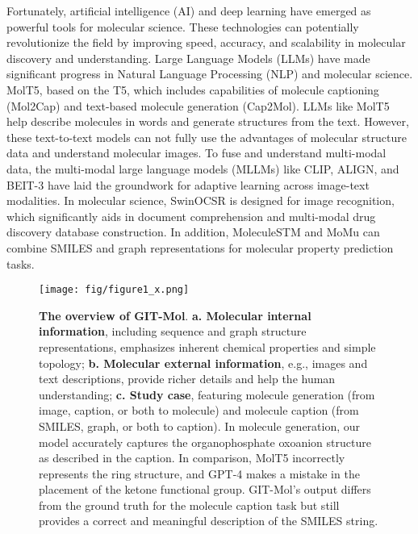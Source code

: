 \documentclass{article}
\begin{document}
Fortunately, artificial intelligence (AI) and deep learning have emerged as powerful tools for molecular science. These technologies can potentially revolutionize the field by improving speed, accuracy, and scalability in molecular discovery and understanding. Large Language Models (LLMs) have made significant progress in Natural Language Processing (NLP) and molecular science. MolT5\cite{edwards2022translation}, based on the T5\cite{raffel2020exploring}, which includes capabilities of molecule captioning (Mol2Cap) and text-based molecule generation (Cap2Mol). LLMs like MolT5 help describe molecules in words and generate structures from the text. However, these text-to-text models can not fully use the advantages of molecular structure data and understand molecular images.
To fuse and understand multi-modal data, the multi-modal large language models (MLLMs) like CLIP\cite{radford2021learning}, ALIGN\cite{jia2021scaling}, and BEIT-3\cite{wang2022image} have laid the groundwork for adaptive learning across image-text modalities. In molecular science, SwinOCSR\cite{xu2022swinocsr} is designed for image recognition, which significantly aids in document comprehension and multi-modal drug discovery database construction\cite{wang2022multi}. In addition, MoleculeSTM\cite{liu2022multi} and MoMu\cite{su2022molecular} can combine SMILES and graph representations for molecular property prediction tasks.

\begin{figure*}[t!]
\centering
\texttt{[image: fig/figure1\_x.png]}
\caption{\textbf{The overview of GIT-Mol}. \textbf{a. Molecular internal information}, including sequence and graph structure representations, emphasizes inherent chemical properties and simple topology; \textbf{b. Molecular external information}, e.g., images and text descriptions, provide richer details and help the human understanding; \textbf{c. Study case}, featuring molecule generation (from image, caption, or both to molecule) and molecule caption (from SMILES, graph, or both to caption). In molecule generation, our model accurately captures the organophosphate oxoanion structure as described in the caption. In comparison, MolT5 incorrectly represents the ring structure, and GPT-4 makes a mistake in the placement of the ketone functional group. GIT-Mol's output differs from the ground truth for the molecule caption task but still provides a correct and meaningful description of the SMILES string. }
\label{fig:Conceptual-GIT-MOL}
\end{figure*}
\end{document}
